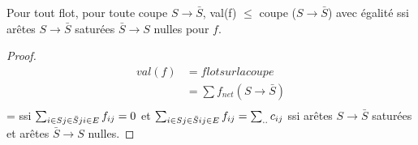 \begin{mylem}
  Pour tout flot, pour toute coupe $S \to \bar{S}$, val(f) $\leq$ coupe ($S \to \bar{S}$)
  avec égalité ssi arêtes $S \to \bar{S}$ saturées $\bar{S} \to S$ nulles pour $f$.
  \begin{proof}
    \begin{align*}
      val(f) & = flot sur la coupe\\
             & = \sum f_{net}(S \to \bar{S})\\
    \end{align*}
    = ssi $\sum_{i \in S\\j \in \bar{S}\\ji \in E} f_{ij} = 0$ et $\sum_{i \in S\\j \in \bar{S}\\ij \in E} f_{ij} = \sum_{..} c_{ij}$
    ssi arêtes $S \to \bar{S}$ saturées et arêtes $\bar{S} \to S$ nulles.
  \end{proof}
\end{mylem}

